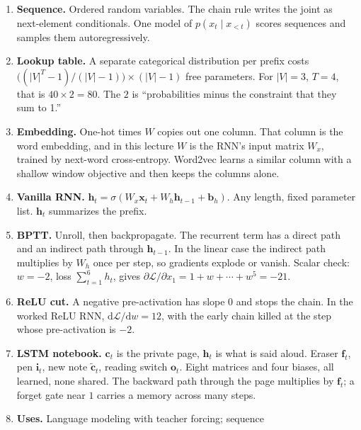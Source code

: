 \documentclass[11pt]{article}
\begin{document}
\begin{enumerate}[leftmargin=*]
  \item \textbf{Sequence.} Ordered random variables. The chain rule writes
        the joint as next-element conditionals. One model of
        \(p(x_t\mid x_{<t})\) scores sequences and samples them
        autoregressively.
  \item \textbf{Lookup table.} A separate categorical distribution per
        prefix costs
        \(\bigl((|V|^T-1)/(|V|-1)\bigr)\times(|V|-1)\)
        free parameters. For \(|V|=3\), \(T=4\), that is \(40\times 2=80\).
        The \(2\) is ``probabilities minus the constraint that they sum to
        1.''
  \item \textbf{Embedding.} One-hot times \(W\) copies out one column.
        That column is the word embedding, and in this lecture \(W\) is the
        RNN's input matrix \(W_x\), trained by next-word cross-entropy.
        Word2vec learns a similar column with a shallow window objective and
        then keeps the columns alone.
  \item \textbf{Vanilla RNN.}
        \(\mathbf{h}_t=\sigma(W_x\mathbf{x}_t+W_h\mathbf{h}_{t-1}+\mathbf{b}_h)\).
        Any length, fixed parameter list. \(\mathbf{h}_t\) summarizes the
        prefix.
  \item \textbf{BPTT.} Unroll, then backpropagate. The recurrent term has a
        direct path and an indirect path through \(\mathbf{h}_{t-1}\). In
        the linear case the indirect path multiplies by \(W_h\) once per
        step, so gradients explode or vanish.
        Scalar check: \(w=-2\), loss \(\sum_{t=1}^{6}h_t\), gives
        \(\partial\mathcal{L}/\partial x_1=1+w+\cdots+w^5=-21\).
  \item \textbf{ReLU cut.} A negative pre-activation has slope \(0\) and
        stops the chain. In the worked ReLU RNN,
        \(\mathrm{d}\mathcal{L}/\mathrm{d}w=12\), with the early chain
        killed at the step whose pre-activation is \(-2\).
  \item \textbf{LSTM notebook.} \(\mathbf{c}_t\) is the private page,
        \(\mathbf{h}_t\) is what is said aloud. Eraser \(\mathbf{f}_t\), pen
        \(\mathbf{i}_t\), new note \(\tilde{\mathbf{c}}_t\), reading switch
        \(\mathbf{o}_t\). Eight matrices and four biases, all learned,
        none shared. The backward path through the page multiplies by
        \(\mathbf{f}_t\); a forget gate near \(1\) carries a memory across
        many steps.
  \item \textbf{Uses.} Language modeling with teacher forcing; sequence

\end{enumerate}
\end{document}
